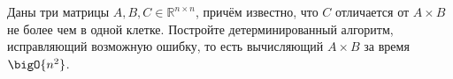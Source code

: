 Даны три матрицы $A, B, C \in \mathbb{R}^{n \times n}$, причём известно, что $C$ отличается от $A \times
B$ не более чем в одной клетке. Постройте детерминированный алгоритм, исправляющий возможную ошибку, то
есть вычисляющий $A \times B$ за время $\bigO{n^2}$.

